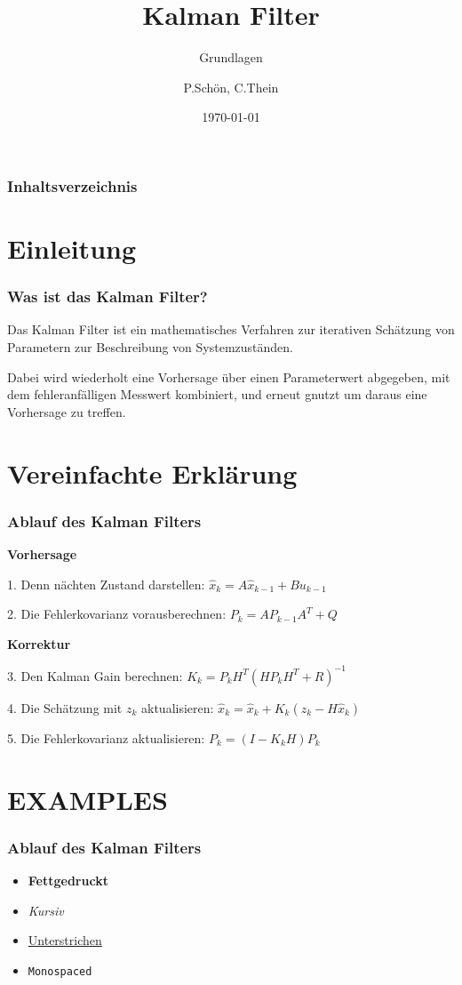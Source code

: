 \documentclass{beamer}
\title{Kalman Filter}
\subtitle{Grundlagen}
\author{P.Schön, C.Thein}
\date{\today}
\begin{document}
\frame{\titlepage}

\begin{frame}
\frametitle{Inhaltsverzeichnis}
\tableofcontents
\end{frame}

\section{Einleitung}

\begin{frame}
\frametitle{Was ist das Kalman Filter?}
Das Kalman Filter ist ein mathematisches Verfahren zur iterativen Schätzung von Parametern zur 
Beschreibung von Systemzuständen. 

Dabei wird wiederholt eine Vorhersage über einen Parameterwert 
abgegeben, mit dem fehleranfälligen Messwert kombiniert, und erneut gnutzt um daraus eine Vorhersage 
zu treffen.
\end{frame}

\section{Vereinfachte Erklärung}




\begin{frame}
    \frametitle{Ablauf des Kalman Filters}

    \textbf{Vorhersage}

    1. Denn nächten Zustand darstellen: \( \hat{x}_{k} = A\hat{x}_{k-1}+Bu_{k-1} \)

    2. Die Fehlerkovarianz vorausberechnen: \( P_{k}=AP_{k-1}A^{T}+Q \)

    \textbf{Korrektur}

    3. Den Kalman Gain berechnen: \( K_{k}=P_{k}H^{T}(HP_{k}H^T+R)^{-1} \)

    4. Die Schätzung mit \(z_k\) aktualisieren: \( \hat{x}_{k}=\hat{x}_{k}+K_{k}(z_{k}-H\hat{x}_{k}) \)

    5. Die Fehlerkovarianz aktualisieren: \( P_{k}=(I-K_{k}H)P_{k} \)
\end{frame}


\section{EXAMPLES}

\begin{frame}
    \frametitle{Ablauf des Kalman Filters}
    \begin{itemize}
        \item \textbf{Fettgedruckt}
        \item \textit{Kursiv}
        \item \underline{Unterstrichen}
        \item \texttt{Monospaced}
    \end{itemize}
\end{frame}
\end{document}
